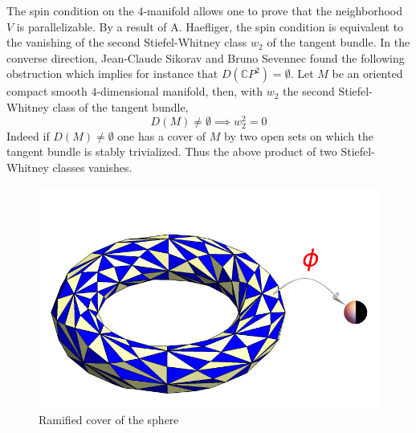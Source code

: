 \documentclass[12pt]{article}
\begin{document}
The spin condition on the $4$-manifold allows one to prove that the neighborhood $V$ is parallelizable. By a result of A. Haefliger, the spin condition is equivalent to the vanishing of the second Stiefel-Whitney class $w_2$ of the tangent bundle.
In the converse direction,   
Jean-Claude Sikorav and Bruno Sevennec found the following obstruction which
implies for instance that $D(\mathbb{C}P^{2})=\emptyset$. 
Let $M$ be an oriented compact smooth $4$-dimensional manifold, then, with
$w_{2}$ the second Stiefel-Whitney class of the tangent bundle,
\[
D(M)\neq\emptyset\implies w_{2}^{2}=0
\]
Indeed if $D(M)\neq\emptyset$ one  has a cover of $M$ by two open sets on which the tangent bundle is stably
trivialized. Thus the above product of two Stiefel-Whitney classes vanishes.
\begin{figure}[H]
\begin{center}
\includegraphics[scale=1]{tortri5.pdf}
\end{center}
\caption{Ramified cover of the sphere \label{butterfly} }
\end{figure}
\end{document}
